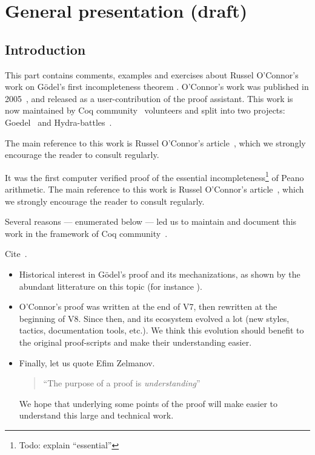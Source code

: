\chapter{General presentation (draft)}

\section{Introduction}
This part contains comments, examples  and exercises about Russel O'Connor's work on G\"{o}del's first incompleteness theorem  \cite{Godel1986-GDECW}.
O'Connor's work was published in 2005~\cite{OConnor05}, and released as a user-contribution of the \coq proof assistant.
This work is now maintained by Coq community~\cite{CoqCommunity} volunteers and split into two projects: Goedel~\cite{Goedel} and Hydra-battles~\cite{HydraBattles}.

The main reference to this work is  Russel O'Connor's article~\cite{OConnor05}, which we strongly encourage the reader to 
consult regularly. 

It was the first computer verified proof of
the essential incompleteness\footnote{Todo: explain ``essential''} of Peano arithmetic.
The main reference to this work is  Russel O'Connor's article~\cite{OConnor05}, which we strongly encourage the reader to 
consult regularly. 

Several reasons --- enumerated below --- led us to maintain and document this work in the framework of 
Coq community~\cite{CoqCommunity}.

\begin{todo}
  Cite~\cite{Dowek2023}.
\end{todo}

 \begin{itemize}
 \item Historical interest in G\"{o}del's proof and its mechanizations, as shown by the abundant litterature on this topic
   (for instance \cite{smullyan1992godel, Hofstadter1999Godel, GoedelCassou}).
 
   
  \item O'Connor's proof was written at the end of \coq V7, then rewritten at the beginning of \coq V8. Since then, \coq and its ecosystem evolved a lot (new styles, tactics, documentation tools, etc.).
          We think this evolution should benefit
          to the original proof-scripts and make their understanding easier.

        \item Finally, let us quote  Efim Zelmanov.
             \begin{quote}
      ``The purpose of a proof is \emph{understanding}'' ~\cite{mathproof}
       
    \end{quote}
    We hope that underlying some points of the proof will
     make easier to understand this large and technical work.

        \end{itemize}

